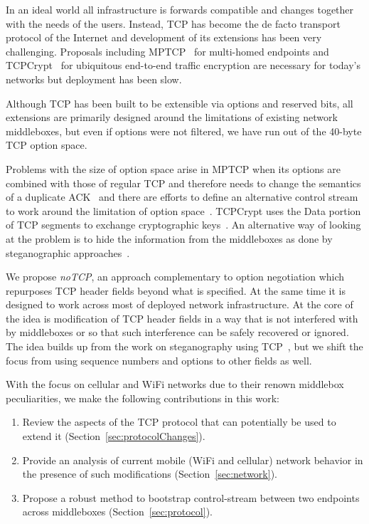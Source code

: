 \documentclass{sig-alternate-10pt}
\begin{document}
In an ideal world all infrastructure is forwards compatible and changes together with the needs of the users. Instead, TCP has become the de facto transport protocol of the Internet and development of its extensions has been very challenging. Proposals including MPTCP~\cite{Handley:vj} for multi-homed endpoints and TCPCrypt~\cite{Mazieres:uz} for ubiquitous end-to-end traffic encryption are necessary for today's networks but deployment has been slow.

Although TCP has been built to be extensible via options and reserved bits, all extensions are primarily designed around the limitations of existing network middleboxes\cite{Honda,Guha2005tb,UntoldMiddlebox2011}, but even if options were not filtered, we have run out of the 40-byte TCP option space.

Problems with the size of option space arise in MPTCP when its options are combined with those of regular TCP and therefore needs to change the semantics of a duplicate ACK~\cite{Handley:vj} and there are efforts to define an alternative control stream to work around the limitation of option space~\cite{Bonaventure:wx}. TCPCrypt uses the Data portion of TCP segments to exchange cryptographic keys~\cite{Mazieres:uz}. An alternative way of looking at the problem is to hide the information from the middleboxes as done by steganographic approaches~\cite{Frczek:2012dl,Zielinska:2014fn,Rowland:1997vq,Murdoch:2005fz}.

We propose \emph{noTCP}, an approach complementary to option negotiation which repurposes TCP header fields beyond what is specified. At the same time it is designed to work across most of deployed network infrastructure. At the core of the idea is modification of TCP header fields in a way that is not interfered with by middleboxes or so that such interference can be safely recovered or ignored. The idea builds up from the work on steganography using TCP~\cite{Frczek:2012dl,Murdoch:2005fz}, but we shift the focus from using sequence numbers and options to other fields as well.

With the focus on cellular and WiFi networks due to their renown middlebox peculiarities, we make the following contributions in this work:

\begin{enumerate}
    \item Review the aspects of the TCP protocol that can potentially be used to extend it (Section~\ref{sec:protocolChanges}).
    \item Provide an analysis of current mobile (WiFi and cellular) network behavior in the presence of such modifications (Section~\ref{sec:network}).
    \item Propose a robust method to bootstrap control-stream between two endpoints across middleboxes (Section~\ref{sec:protocol}).
\end{enumerate}
\end{document}
